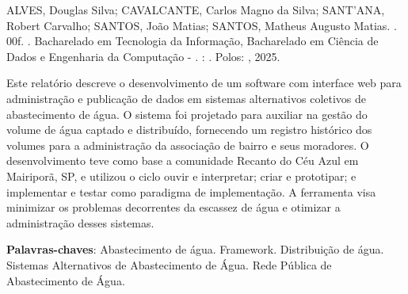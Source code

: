 \setlength{\absparsep}{18pt} %
\SingleSpacing
\begin{fichacatalografica}        
    \noindent
    \SingleSpacing    
        ALVES, Douglas Silva; CAVALCANTE, Carlos Magno da Silva; SANT'ANA, Robert Carvalho; SANTOS, João Matias; SANTOS, Matheus Augusto Matias. \textbf{\imprimirtitulo}. 00f. \imprimirtipotrabalho. Bacharelado em Tecnologia da Informação, Bacharelado em Ciência de Dados e Engenharia da Computação - \textbf{\imprimirinstituicao}. \imprimirorientadorRotulo:  \imprimirorientador. Polos: \imprimirlocal, 2025.
    
    
\end{fichacatalografica}
\begin{resumo}
    Este relatório descreve o desenvolvimento de um software com interface web para administração e publicação de dados em sistemas alternativos coletivos de abastecimento de água.  O sistema foi projetado para auxiliar na gestão do volume de água captado e distribuído, fornecendo um registro histórico dos volumes para a administração da associação de bairro e seus moradores.  O desenvolvimento teve como base a comunidade Recanto do Céu Azul em Mairiporã, SP, e utilizou o ciclo ouvir e interpretar; criar e prototipar; e implementar e testar como paradigma de implementação.  A ferramenta visa minimizar os problemas decorrentes da escassez de água e otimizar a administração desses sistemas.
    
    \noindent
    \textbf{Palavras-chaves}: Abastecimento de água. Framework. Distribuição de água. Sistemas Alternativos de Abastecimento de Água. Rede Pública de Abastecimento de Água.

\end{resumo}